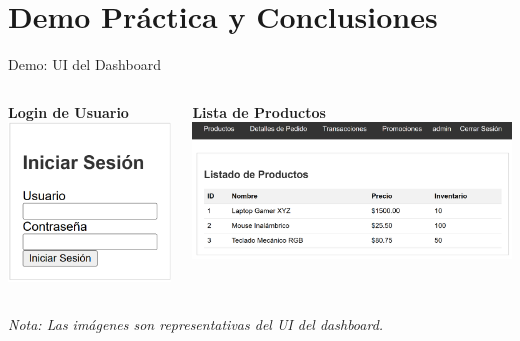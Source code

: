 \documentclass[spanish]{beamer}
\begin{document}
\section{Demo Práctica y Conclusiones}

\begin{frame}{Demo: UI del Dashboard}
    \begin{columns}
        \begin{column}{0.3\textwidth}
            \textbf{Login de Usuario}\\
            \includegraphics[width=\textwidth]{login_ui.png}
        \end{column}
        \begin{column}{0.5\textwidth}
            \textbf{Lista de Productos}\\
            \includegraphics[width=\textwidth]{products_ui.png}
        \end{column}
    \end{columns}
    \tiny{\textit{Nota: Las imágenes son representativas del UI del dashboard.}}
\end{frame}
\end{document}
